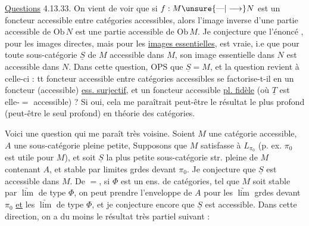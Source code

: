 \uline{Questions} 4.13.33. On vient de voir que si $f:M\unsure{\text{---}|\longrightarrow}N$ est un foncteur accessible entre catégories accessibles, alors l'image inverse d'une  partie accessible de $\mathrm{Ob}\,N$ est une partie accessible de $\mathrm{Ob}\,M$.
Je conjecture que l'énoncé ,  pour les images directes, mais pour les \uline{images essentielles}, est
vraie, i.e que pour toute  sous-catégorie $\underline S$ de $M$ accessible dans $M$,  son image essentielle dans $N$ est accessible dans $N$. Dans cette question, $\mathrm{OPS}$ que $\underline S=M$, et la question revient à celle-ci : tt foncteur accessible  entre catégories accessibles se factorise-t-il en un foncteur (accessible) \uline{ess. surjectif}, et un foncteur accessible \uline{pl. fidèle}  (où $\underline T$ est elle-$=$ accessible) ?
Si oui, cela me paraîtrait peut-être le résultat le plus profond (peut-être le seul  profond) en théorie des catégories.

Voici une question qui me paraît très voisine. Soient $M$ une catégorie accessible, $A$ une sous-catégorie pleine petite, Supposons que $M$ satisfasse à $L_{\pi_0}$ (p. ex. $\pi_0$ est utile pour $M$), et soit $\underline S$ la plus petite sous-catégorie str. pleine de $M$ contenant $A$, et stable par limites grdes devant $\pi_0$.  Je conjecture que $\underline S$ est accessible dans $M$.
De $=$, si $\Phi$ est un  ens. de  catégories,   tel que $M$ soit stable par $\underrightarrow{\lim}$ de type $\Phi$, on peut prendre l'enveloppe  de $A$ pour les $\underrightarrow{\lim}$ grdes devant $\pi_0$ \uline{et} les $\underrightarrow{\lim}$ de type $\Phi$, et je conjecture encore que $\underline S$ est accessible. Dans cette direction, on a du moins le résultat très partiel suivant :


